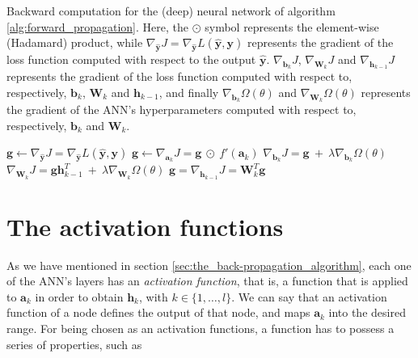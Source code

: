 		\begin{algorithm}[H]
			\caption{Backward computation for the (deep) neural network of algorithm
			\ref{alg:forward_propagation}. Here, the $\odot$ symbol represents the element-wise
			(Hadamard) product, while $\nabla_{\hat{\mathbf{y}}}J =
			\nabla_{\hat{\mathbf{y}}}L(\hat{\mathbf{y}}, \mathbf{y})$ represents the gradient of the loss
			function computed with respect to the output $\hat{\mathbf{y}}$. $\nabla_{\mathbf{b}_{k}}J$,
			$\nabla_{\mathbf{W}_{k}}J$ and $\nabla_{\mathbf{h}_{k - 1}}J$ represents the gradient of the
			loss function computed with respect to, respectively, $\mathbf{b}_{k}$, $\mathbf{W}_{k}$ and
			$\mathbf{h}_{k - 1}$, and finally $\nabla_{\mathbf{b}_{k}} \Omega(\theta)$ and
			$\nabla_{\mathbf{W}_{k}} \Omega(\theta)$ represents the gradient of the ANN's hyperparameters computed
			with respect to, respectively, $\mathbf{b}_{k}$ and $\mathbf{W}_{k}$.}
			\label{alg:backward_propagation}
			\begin{algorithmic}[1]
					\State $\mathbf{g} \leftarrow \nabla_{\hat{\mathbf{y}}}J = \nabla_{\hat{\mathbf{y}}}
					L(\hat{\mathbf{y}}, \mathbf{y})$
						\State $\mathbf{g} \leftarrow \nabla_{\mathbf{a}_{k}}J = \mathbf{g} \ \odot \
						f'(\mathbf{a}_{k})$
						\State $\nabla_{\mathbf{b}_{k}}J = \mathbf{g} \ + \ \lambda \nabla_{\mathbf{b}_{k}}
						\Omega(\theta)$
						\State $\nabla_{\mathbf{W}_{k}}J = \mathbf{g}\mathbf{h}_{k - 1}^{T} \ + \ \lambda
						\nabla_{\mathbf{W}_{k}} \Omega(\theta)$
						\State $\mathbf{g} = \nabla_{\mathbf{h}_{k - 1}}J = \mathbf{W}_{k}^{T}\mathbf{g}$
					\EndFor
				\EndProcedure
			\end{algorithmic}
		\end{algorithm}

	\section{The activation functions} %
	\label{sec:the_activation_functions}
		As we have mentioned in section \ref{sec:the_back-propagation_algorithm}, each one of the ANN's layers
		has an \textit{activation function}, that is, a function that is applied to $\mathbf{a}_{k}$ in order to
		obtain $\mathbf{h}_k$, with $k \in \{1,\ldots,l\}$. We can say that an activation function of a node
		defines the output of that node, and maps $\mathbf{a}_{k}$ into the desired range. For being chosen as
		an activation functions, a function has to possess a series of properties, such as


